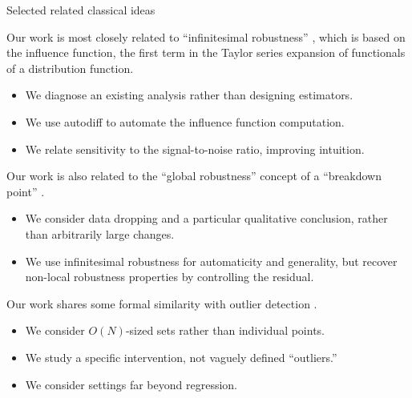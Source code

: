 \begin{frame}{Selected related classical ideas}

Our work is most closely related to ``infinitesimal robustness''
\parencite{hampel1974influence, hampel1986robustbook}, which is based on the
influence function, the first term in the Taylor series expansion
of functionals of a distribution function.
%
\begin{itemize}
    \item We diagnose an existing analysis rather than designing
    estimators.
    \item We use autodiff to automate the influence function computation.
    \item We relate sensitivity to the signal-to-noise ratio, improving intuition.
\end{itemize}

\vspace{1em} Our work is also related to the ``global robustness'' concept of a
``breakdown point'' \parencite{huber1981robust, huber:1983:notion}.
%
\begin{itemize}
    \item We consider data dropping and a particular qualitative conclusion,
    rather than arbitrarily large changes.
    \item We use infinitesimal robustness for automaticity and generality,
    but recover non-local robustness properties by controlling the residual.
\end{itemize}

\vspace{1em} Our work shares some formal similarity with outlier detection
\parencite{cook1977detection, belsley2005regression}.
%
\begin{itemize}
    \item We consider $O(N)$-sized sets rather than individual points.
    \item We study a specific intervention, not vaguely defined
    ``outliers.''
    \item We consider settings far beyond regression.
\end{itemize}



\end{frame}




